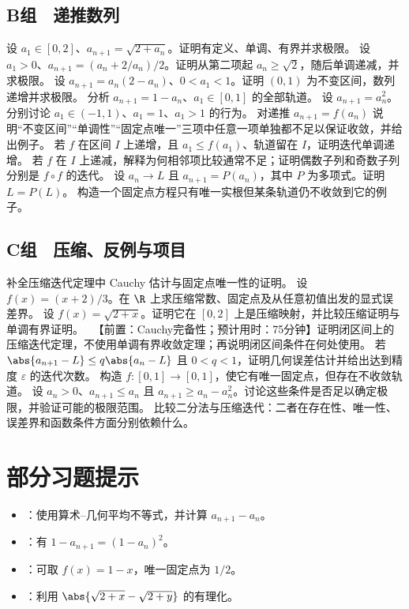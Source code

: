 \subsection*{B组　递推数列}
\begin{enumerate}[label=\textbf{10.\arabic*.},resume]
  \mustdo 设 \(a_1\in[0,2]\)、\(a_{n+1}=\sqrt{2+a_n}\)。证明有定义、单调、有界并求极限。
  \mustdo 设 \(a_1>0\)、\(a_{n+1}=(a_n+2/a_n)/2\)。证明从第二项起 \(a_n\ge\sqrt2\)，随后单调递减，并求极限。
  \mustdo 设 \(a_{n+1}=a_n(2-a_n)\)、\(0<a_1<1\)。证明 \((0,1)\) 为不变区间，数列递增并求极限。
  \mustdo 分析 \(a_{n+1}=1-a_n\)、\(a_1\in[0,1]\) 的全部轨道。
  \mustdo 设 \(a_{n+1}=a_n^2\)。分别讨论 \(a_1\in(-1,1)\)、\(a_1=1\)、\(a_1>1\) 的行为。
  \mustdo 对递推 \(a_{n+1}=f(a_n)\) 说明“不变区间”“单调性”“固定点唯一”三项中任意一项单独都不足以保证收敛，并给出例子。
  \mustdo 若 \(f\) 在区间 \(I\) 上递增，且 \(a_1\le f(a_1)\)、轨道留在 \(I\)，证明迭代单调递增。
  \mustdo 若 \(f\) 在 \(I\) 上递减，解释为何相邻项比较通常不足；证明偶数子列和奇数子列分别是 \(f\circ f\) 的迭代。
  \mustdo 设 \(a_n\to L\) 且 \(a_{n+1}=P(a_n)\)，其中 \(P\) 为多项式。证明 \(L=P(L)\)。
  \mustdo 构造一个固定点方程只有唯一实根但某条轨道仍不收敛到它的例子。
\end{enumerate}

\subsection*{C组　压缩、反例与项目}
\begin{enumerate}[label=\textbf{10.\arabic*.},resume]
  \mustdo 补全压缩迭代定理中 Cauchy 估计与固定点唯一性的证明。
  \mustdo 设 \(f(x)=(x+2)/3\)。在 \(\R\) 上求压缩常数、固定点及从任意初值出发的显式误差界。
  \mustdo 设 \(f(x)=\sqrt{2+x}\)。证明它在 \([0,2]\) 上是压缩映射，并比较压缩证明与单调有界证明。
  \projectdo\ 【前置：Cauchy完备性；预计用时：75分钟】证明闭区间上的压缩迭代定理，不使用单调有界收敛定理；再说明闭区间条件在何处使用。
  \optionaldo 若 \(\abs{a_{n+1}-L}\le q\abs{a_n-L}\) 且 \(0<q<1\)，证明几何误差估计并给出达到精度 \(\varepsilon\) 的迭代次数。
  \optionaldo 构造 \(f:[0,1]\to[0,1]\)，使它有唯一固定点，但存在不收敛轨道。
  \optionaldo 设 \(a_n>0\)、\(a_{n+1}\le a_n\) 且 \(a_{n+1}\ge a_n-a_n^2\)。讨论这些条件是否足以确定极限，并验证可能的极限范围。
  \opendo 比较二分法与压缩迭代：二者在存在性、唯一性、误差界和函数条件方面分别依赖什么。
\end{enumerate}

\section*{部分习题提示}
\begin{itemize}
 \item {}：使用算术--几何平均不等式，并计算 \(a_{n+1}-a_n\)。
 \item {}：有 \(1-a_{n+1}=(1-a_n)^2\)。
 \item {}：可取 \(f(x)=1-x\)，唯一固定点为 \(1/2\)。
 \item {}：利用 \(\abs{\sqrt{2+x}-\sqrt{2+y}}\) 的有理化。
\end{itemize}
